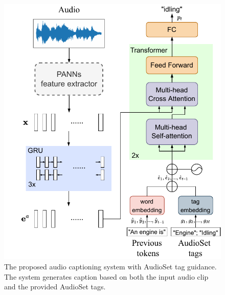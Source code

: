 \documentclass[sigconf,anonymous,review]{acmart}
\begin{document}
\begin{figure}[ht]
    \centering
    \includegraphics[width=\linewidth]{figs/tag_caption_model.pdf}
    \caption{The proposed audio captioning system with AudioSet tag guidance. The system generates caption based on both the input audio clip and the provided AudioSet tags.}
    \label{fig:tag_caption_model}
\end{figure}
\end{document}

